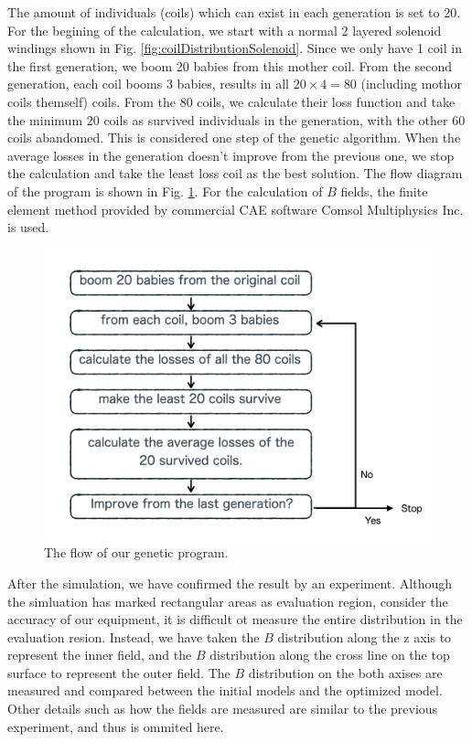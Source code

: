 The amount of individuals (coils) which can exist in each generation is set to 20.
For the begining of the calculation, we start with a normal 2 layered solenoid windings shown in Fig. \ref{fig:coilDistributionSolenoid}.
Since we only have 1 coil in the first generation, we boom 20 babies from this mother coil.
From the second generation, each coil booms 3 babies, results in all $20\times4 = 80$ (including mothor coils themself) coils.
From the 80 coils, we calculate their loss function and take the minimum 20 coils as survived individuals in the generation,
with the other 60 coils abandomed.
This is considered one step of the genetic algorithm.
When the average losses in the generation doesn't improve from the previous one,
we stop the calculation and take the least loss coil as the best solution.
The flow diagram of the program is shown in Fig. \ref{fig:flowOfGenetic}.
For the calculation of $B$ fields, the finite element method provided by commercial CAE software Comsol Multiphysics Inc. is used.
\begin{figure}[H]
  \includegraphics[width=18cm, bb=9 9 900 800]{./section4Optimal/geneticFlow.png}
  \caption{The flow of our genetic program.}
  \label{fig:flowOfGenetic}
\end{figure}

After the simulation, we have confirmed the result by an experiment.
Although the simluation has marked rectangular areas as evaluation region,
consider the accuracy of our equipment,
it is difficult ot measure the entire distribution in the evaluation resion.
Instead, we have taken the $B$ distribution along the z axis to represent the inner field,
and the $B$ distribution along the cross line on the top surface to represent the outer field.
The $B$ distribution on the both axises are measured and compared between the initial models and the optimized model.
Other details such as how the fields are measured are similar to the previous experiment,
and thus is ommited here.


